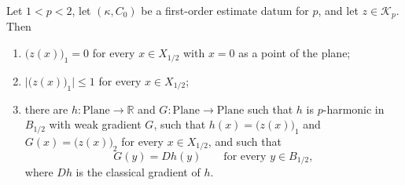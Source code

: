 \begin{lemma}
Let $1<p<2$, let $(\kappa,C_0)$ be a first-order estimate datum for $p$, and let
$z\in\mathcal{K}_p$.  Then
\begin{enumerate}
\item[(a)] $\bigl(z(x)\bigr)_1=0$ for every $x\in X_{1/2}$ with $x=0$ as a point of the plane;
\item[(b)] $\bigl\lvert\bigl(z(x)\bigr)_1\bigr\rvert\le1$ for every $x\in X_{1/2}$;
\item[(c)] there are $h\colon\mathrm{Plane}\to\mathbb{R}$ and
$G\colon\mathrm{Plane}\to\mathrm{Plane}$ such that $h$ is $p$-harmonic in $B_{1/2}$ with weak
gradient $G$, such that $h(x)=\bigl(z(x)\bigr)_1$ and $G(x)=\bigl(z(x)\bigr)_2$ for every
$x\in X_{1/2}$, and such that
\[
  G(y)=Dh(y)\qquad\text{for every }y\in B_{1/2},
\]
where $Dh$ is the classical gradient of $h$.
\end{enumerate}
\end{lemma}
